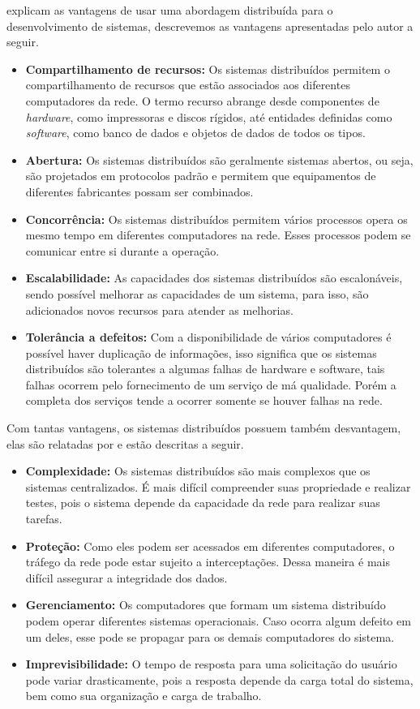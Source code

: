  explicam as vantagens de usar uma abordagem distribuída para o desenvolvimento de sistemas, descrevemos as vantagens apresentadas pelo autor a seguir.
\begin{itemize}
	\item \textbf{Compartilhamento de recursos:} Os sistemas distribuídos permitem o compartilhamento de recursos que estão associados aos diferentes computadores da rede. O termo recurso abrange desde componentes de \textit{hardware}, como impressoras e discos rígidos, até entidades definidas como \textit{software}, como banco de dados e objetos de dados de todos os tipos.
	\item \textbf{Abertura:} Os sistemas distribuídos são geralmente sistemas abertos, ou seja, são projetados em protocolos padrão e permitem que equipamentos de diferentes fabricantes possam ser combinados.
	\item \textbf{Concorrência:} Os sistemas distribuídos permitem vários processos opera os mesmo tempo em diferentes computadores na rede. Esses processos podem se comunicar entre si durante a operação.
	\item \textbf{Escalabilidade:} As capacidades dos sistemas distribuídos são escalonáveis, sendo possível melhorar as capacidades de um sistema, para isso, são adicionados novos recursos para atender as melhorias. 
	\item \textbf{Tolerância a defeitos:} Com a disponibilidade de vários computadores é possível haver duplicação de informações, isso significa que os sistemas distribuídos são tolerantes a algumas falhas de hardware e software, tais falhas ocorrem pelo fornecimento de um serviço de má qualidade. Porém a completa dos serviços tende a ocorrer somente se houver falhas na rede.
\end{itemize}
Com tantas vantagens, os sistemas distribuídos possuem também desvantagem, elas são relatadas por  e estão descritas a seguir.
\begin{itemize}
	\item \textbf{Complexidade:} Os sistemas distribuídos são mais complexos que os sistemas centralizados. É mais difícil compreender suas propriedade e realizar testes, pois o sistema depende da capacidade da rede para realizar suas tarefas.
	\item \textbf{Proteção:} Como eles podem ser acessados em diferentes computadores, o tráfego da rede pode estar sujeito a interceptações. Dessa maneira é mais difícil assegurar a integridade dos dados.
	\item \textbf{Gerenciamento:} Os computadores que formam um sistema distribuído podem operar diferentes sistemas operacionais. Caso ocorra algum defeito em um deles, esse pode se propagar para os demais computadores do sistema.
	\item \textbf{Imprevisibilidade:} O tempo de resposta para uma solicitação do usuário pode variar drasticamente, pois a resposta depende da carga total do sistema, bem como sua organização e carga de trabalho. 
\end{itemize}

